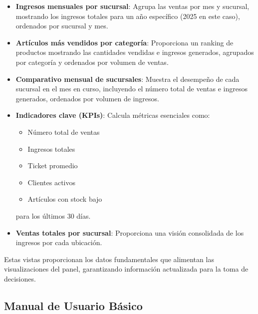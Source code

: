 \documentclass[a4paper, 12pt]{article}
\begin{document}
\begin{itemize}
    \item \textbf{Ingresos mensuales por sucursal}: Agrupa las ventas por mes y sucursal, mostrando los ingresos totales para un año específico (2025 en este caso), ordenados por sucursal y mes.

    \item \textbf{Artículos más vendidos por categoría}: Proporciona un ranking de productos mostrando las cantidades vendidas e ingresos generados, agrupados por categoría y ordenados por volumen de ventas.

    \item \textbf{Comparativo mensual de sucursales}: Muestra el desempeño de cada sucursal en el mes en curso, incluyendo el número total de ventas e ingresos generados, ordenados por volumen de ingresos.

    \item \textbf{Indicadores clave (KPIs)}: Calcula métricas esenciales como:
    \begin{itemize}
        \item Número total de ventas
        \item Ingresos totales
        \item Ticket promedio
        \item Clientes activos
        \item Artículos con stock bajo
    \end{itemize}
    para los últimos 30 días.

    \item \textbf{Ventas totales por sucursal}: Proporciona una visión consolidada de los ingresos por cada ubicación.
\end{itemize}

Estas vistas proporcionan los datos fundamentales que alimentan las visualizaciones del panel, garantizando información actualizada para la toma de decisiones.

\subsection{Manual de Usuario Básico}
\end{document}
